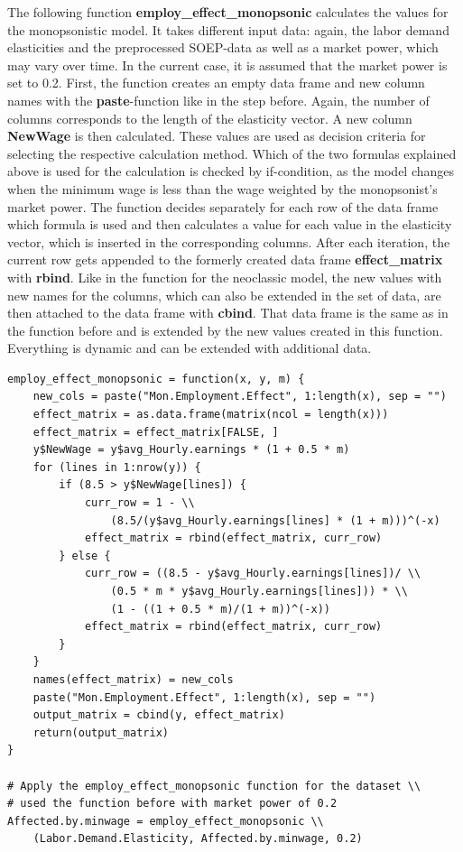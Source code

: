 \documentclass[a4paper]{article}
\begin{document}
The following function \textbf{employ\_effect\_monopsonic} calculates the values for the monopsonistic model. It takes different input data: again, the labor demand elasticities and the preprocessed SOEP-data as well as a market power, which may vary over time. In the current case, it is assumed that the market power is set to 0.2. First, the function creates an empty data frame and new column names with the \textbf{paste}-function like in the step before. Again, the number of columns corresponds to the length of the elasticity vector. A new column \textbf{NewWage} is then calculated. These values are used as decision criteria for selecting the respective calculation method. Which of the two formulas explained above is used for the calculation is checked by if-condition, as the model changes when the minimum wage is less than the wage weighted by the monopsonist's market power. The function decides separately for each row of the data frame which formula is used and then calculates a value for each value in the elasticity vector, which is inserted in the corresponding columns. After each iteration, the current row gets appended to the formerly created data frame \textbf{effect\_matrix} with \textbf{rbind}. Like in the function for the neoclassic model, the new values with new names for the columns, which can also be extended in the set of data, are then attached to the data frame with \textbf{cbind}. That data frame is the same as in the function before and is extended by the new values created in this function. Everything is dynamic and can be extended with additional data. 
\begin{lstlisting}
employ_effect_monopsonic = function(x, y, m) {
    new_cols = paste("Mon.Employment.Effect", 1:length(x), sep = "")
    effect_matrix = as.data.frame(matrix(ncol = length(x)))
    effect_matrix = effect_matrix[FALSE, ]
    y$NewWage = y$avg_Hourly.earnings * (1 + 0.5 * m) 
    for (lines in 1:nrow(y)) {
        if (8.5 > y$NewWage[lines]) {
            curr_row = 1 - \\
            	(8.5/(y$avg_Hourly.earnings[lines] * (1 + m)))^(-x)
            effect_matrix = rbind(effect_matrix, curr_row)
        } else {
            curr_row = ((8.5 - y$avg_Hourly.earnings[lines])/ \\
            	(0.5 * m * y$avg_Hourly.earnings[lines])) * \\
                (1 - ((1 + 0.5 * m)/(1 + m))^(-x))
            effect_matrix = rbind(effect_matrix, curr_row)
        }
    }
    names(effect_matrix) = new_cols 
    paste("Mon.Employment.Effect", 1:length(x), sep = "")
    output_matrix = cbind(y, effect_matrix) 
    return(output_matrix)
}

# Apply the employ_effect_monopsonic function for the dataset \\
# used the function before with market power of 0.2
Affected.by.minwage = employ_effect_monopsonic \\
	(Labor.Demand.Elasticity, Affected.by.minwage, 0.2)
\end{lstlisting}
\end{document}
